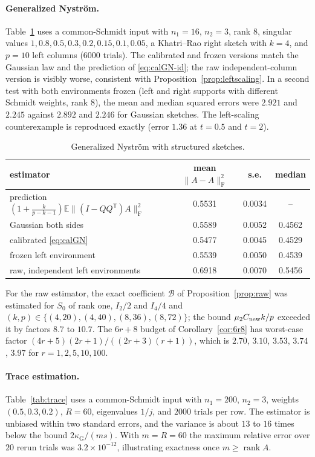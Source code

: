 \documentclass[11pt,a4paper]{article}
\theoremstyle{definition}
\theoremstyle{remark}
\numberwithin{equation}{section}
\newcommand{\E}{\mathbb E}
\newcommand{\T}{{\mathsf T}}
\newcommand{\rank}{\operatorname{rank}}
\newcommand{\norm}[1]{\lVert#1\rVert}
\newcommand{\kapG}{\kappa_{\mathrm G}}
\newcommand{\F}{\mathrm F}
\begin{document}
\paragraph{Generalized Nystr\"om.} Table~\ref{tab:gn} uses a common-Schmidt
input with $n_1=16$, $n_2=3$, rank $8$, singular values
$1,0.8,0.5,0.3,0.2,0.15,0.1,0.05$, a Khatri--Rao right sketch with $k=4$, and
$p=10$ left columns ($6000$ trials). The calibrated and frozen versions match
the Gaussian law and the prediction of \eqref{eq:calGN-id}; the raw
independent-column version is visibly worse, consistent with
Proposition~\ref{prop:leftscaling}. In a second test with both environments
frozen (left and right supports with different Schmidt weights, rank $8$), the
mean and median squared errors were $2.921$ and $2.245$ against $2.892$ and
$2.246$ for Gaussian sketches. The left-scaling counterexample is reproduced
exactly (error $1.36$ at $t=0.5$ and $t=2$).

\begin{table}[htbp]
\centering\small
\begin{tabular}{@{}lccc@{}}\toprule
estimator & mean $\norm{A-\widehat A}_\F^2$ & s.e. & median\\\midrule
prediction $(1+\frac k{p-k-1})\E\norm{(I-QQ^\T)A}_\F^2$ & 0.5531 & 0.0034 & --\\
Gaussian both sides & 0.5589 & 0.0052 & 0.4562\\
calibrated \eqref{eq:calGN} & 0.5477 & 0.0045 & 0.4529\\
frozen left environment & 0.5539 & 0.0050 & 0.4539\\
raw, independent left environments & 0.6918 & 0.0070 & 0.5456\\\bottomrule
\end{tabular}
\caption{Generalized Nystr\"om with structured sketches.}
\label{tab:gn}
\end{table}

For the raw estimator, the exact coefficient $\mathcal B$ of
Proposition~\ref{prop:raw} was estimated for $S_0$ of rank one, $I_2/2$ and
$I_4/4$ and $(k,p)\in\{(4,20),(4,40),(8,36),(8,72)\}$; the bound
$\mu_2C_{\rm new}k/p$ exceeded it by factors $8.7$ to $10.7$. The
$6r+8$ budget of Corollary~\ref{cor:6r8} has worst-case factor
$(4r+5)(2r+1)/((2r+3)(r+1))$, which is $2.70$, $3.10$, $3.53$, $3.74$, $3.97$ for
$r=1,2,5,10,100$.

\paragraph{Trace estimation.} Table~\ref{tab:trace} uses a common-Schmidt input
with $n_1=200$, $n_2=3$, weights $(0.5,0.3,0.2)$, $R=60$, eigenvalues $1/j$,
and $2000$ trials per row. The estimator is unbiased within two standard
errors, and the variance is about $13$ to $16$ times below the bound $2\kapG/(ms)$.
With $m=R=60$ the maximum relative error over $20$ rerun trials was $3.2\times10^{-12}$,
illustrating exactness once $m\ge\rank A$.
\end{document}
